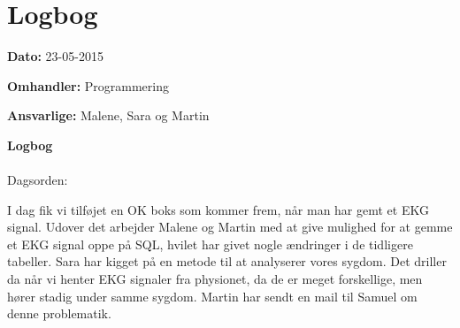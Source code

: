 \chapter{Logbog}

\textbf{Dato:} 23-05-2015

\textbf{Omhandler:} Programmering

\textbf{Ansvarlige:} Malene, Sara og Martin

\textbf{Logbog}
\\
\\
Dagsorden:
\begin{itemize}
	I dag fik vi tilføjet en OK boks som kommer frem, når man har gemt et EKG signal. Udover det arbejder Malene og Martin med at give mulighed for at gemme et EKG signal oppe på SQL, hvilet har givet nogle ændringer i de tidligere tabeller. Sara har kigget på en metode til at analyserer vores sygdom. Det driller da når vi henter EKG signaler fra physionet, da de er meget forskellige, men hører stadig under samme sygdom. Martin har sendt en mail til Samuel om denne problematik. 
\end{itemize}


